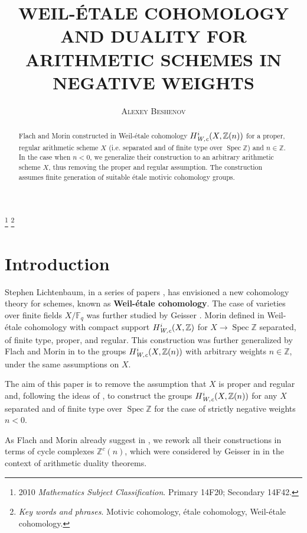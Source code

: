 \documentclass[leqno,12pt]{article}
\title{\uppercase{Weil-\'{e}tale cohomology and duality for arithmetic schemes
    in negative weights}}
\author{\textsc{Alexey Beshenov}}
\date{}
\theoremstyle{plain}
\theoremstyle{definition}
\DeclareMathOperator{\Spec}{Spec}
\newcommand{\FF}{\mathbb{F}}
\newcommand{\ZZ}{\mathbb{Z}}
\newcommand{\Wc}{\text{\it W,c}}
\begin{document}
\maketitle

\footnote{ %
2010 \textit{Mathematics Subject Classification}.
Primary 14F20; Secondary 14F42.}
\footnote{ %
  \textit{Key words and phrases}.
  Motivic cohomology, \'{e}tale cohomology, Weil-\'{e}tale cohomology.}


\begin{abstract}
  Flach and Morin constructed in \cite{Flach-Morin-2018} Weil-\'{e}tale
  cohomology $H^i_\Wc (X, \ZZ(n))$ for a proper, regular arithmetic scheme $X$
  (i.e. separated and of finite type over $\Spec \ZZ$) and $n \in \ZZ$. In the
  case when $n < 0$, we generalize their construction to an arbitrary arithmetic
  scheme $X$, thus removing the proper and regular assumption.  The construction
  assumes finite generation of suitable \'{e}tale motivic cohomology groups.
\end{abstract}

\section{Introduction}

Stephen Lichtenbaum, in a series of papers
\cite{Lichtenbaum-2005,Lichtenbaum-2009-Euler-char,Lichtenbaum-2009-number-rings},
has envisioned a new cohomology theory for schemes, known as
\textbf{Weil-\'{e}tale cohomology}. The case of varieties over finite fields
$X/\FF_q$ was further studied by Geisser
\cite{Geisser-2004,Geisser-2006,Geisser-2010-arithmetic-homology}. Morin defined
in \cite{Morin-2014} Weil-\'{e}tale cohomology with compact support
$H^i_\Wc (X, \ZZ)$ for $X \to \Spec\ZZ$ separated, of finite type, proper, and
regular. This construction was further generalized by Flach and Morin in
\cite{Flach-Morin-2018} to the groups $H^i_\Wc (X, \ZZ(n))$ with arbitrary
weights $n \in \ZZ$, under the same assumptions on $X$.

The aim of this paper is to remove the assumption that $X$ is proper and regular
and, following the ideas of \cite{Flach-Morin-2018}, to construct the groups
$H^i_\Wc (X, \ZZ(n))$ for any $X$ separated and of finite type over $\Spec\ZZ$
for the case of strictly negative weights $n < 0$.

As Flach and Morin already suggest in \cite[Remark 3.11]{Flach-Morin-2018},
we rework all their constructions in terms of cycle complexes $\ZZ^c (n)$, which
were considered by Geisser in \cite{Geisser-2010} in the context of arithmetic
duality theorems.
\end{document}
